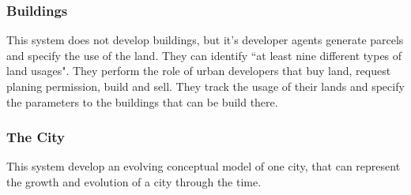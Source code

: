 \subsubsection{Buildings} %
\label{ssub:buildings}

This system does not develop buildings, but it's developer agents generate parcels and specify the use of the land. They can identify ``at least nine different types of land usages". They perform the role of urban developers that buy land, request planing permission, build and sell. They track the usage of their lands and specify the parameters to the buildings that can be build there.


\subsubsection{The City} %
\label{ssub:the_city}

This system develop an evolving conceptual model of one city, that can represent the growth and evolution of a city through the time. 


